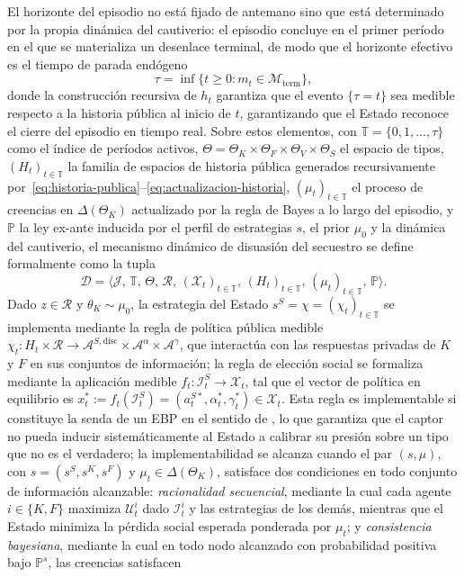 \documentclass[review,authoryear,12pt]{elsarticle}
\theoremstyle{plain}
\theoremstyle{definition}
\newcommand{\Prob}{\mathbb{P}}
\newcommand{\ThetaK}{\Theta_K}
\newcommand{\1}{\mathbf{1}}
\begin{document}
El horizonte del episodio no está fijado de antemano sino que está determinado por la propia dinámica del cautiverio: el episodio concluye en el primer período en el que se materializa un desenlace terminal, de modo que el horizonte efectivo es el tiempo de parada endógeno
\begin{equation}
\tau=\inf\{t\geq 0:m_t\in\mathcal{M}_{\mathrm{term}}\},\label{eq:stopping-time}
\end{equation}
donde la construcción recursiva de $h_t$ garantiza que el evento $\{\tau=t\}$ sea medible respecto a la historia pública al inicio de $t$, garantizando que el Estado reconoce el cierre del episodio en tiempo real. Sobre estos elementos, con $\mathbb{T}=\{0,1,\ldots,\tau\}$ como el índice de períodos activos, $\Theta=\ThetaK\times\Theta_F\times\Theta_V\times\Theta_S$ el espacio de tipos, $(H_t)_{t\in\mathbb{T}}$ la familia de espacios de historia pública generados recursivamente por~\eqref{eq:historia-publica}--\eqref{eq:actualizacion-historia}, $(\mu_t)_{t\in\mathbb{T}}$ el proceso de creencias en $\Delta(\ThetaK)$ actualizado por la regla de Bayes a lo largo del episodio, y $\Prob$ la ley ex-ante inducida por el perfil de estrategias $s$, el prior $\mu_0$ y la dinámica del cautiverio, el mecanismo dinámico de disuasión del secuestro se define formalmente como la tupla
\[
\mathcal{D}=\bigl\langle\mathcal{J},\,\mathbb{T},\,\Theta,\,\mathcal{R},\,(\mathcal{X}_t)_{t\in\mathbb{T}},\,(H_t)_{t\in\mathbb{T}},\,(\mu_t)_{t\in\mathbb{T}},\,\Prob\bigr\rangle.
\]
Dado $z\in\mathcal{R}$ y $\theta_K\sim\mu_0$, la estrategia del Estado $s^S=\chi=(\chi_t)_{t\in\mathbb{T}}$ se implementa mediante la regla de política pública medible $\chi_t\colon H_t\times\mathcal{R}\to\mathcal{A}^{S,\mathrm{disc}}\times\mathcal{A}^{\alpha}\times\mathcal{A}^{\gamma}$, que interactúa con las respuestas privadas de $K$ y $F$ en sus conjuntos de información; la regla de elección social se formaliza mediante la aplicación medible $f_t\colon\mathcal{I}_t^S\to\mathcal{X}_t$, tal que el vector de política en equilibrio es $x_t^\ast:=f_t(\mathcal{I}_t^S)=(a_t^{S\ast},\alpha_t^\ast,\gamma_t^\ast)\in\mathcal{X}_t$. Esta regla es implementable si constituye la senda de un EBP en el sentido de \citet{FudenbergTirole1991}, lo que garantiza que el captor no pueda inducir sistemáticamente al Estado a calibrar su presión sobre un tipo que no es el verdadero; la implementabilidad se alcanza cuando el par $(s,\mu)$, con $s=(s^S,s^K,s^F)$ y $\mu_t\in\Delta(\ThetaK)$, satisface dos condiciones en todo conjunto de información alcanzable: \emph{racionalidad secuencial}, mediante la cual cada agente $i\in\{K,F\}$ maximiza $\mathcal{U}_t^i$ dado $\mathcal{I}_t^i$ y las estrategias de los demás, mientras que el Estado minimiza la pérdida social esperada ponderada por $\mu_t$; y \emph{consistencia bayesiana}, mediante la cual en todo nodo alcanzado con probabilidad positiva bajo $\Prob^s$, las creencias satisfacen
\end{document}
